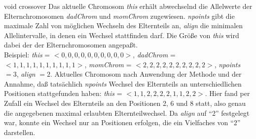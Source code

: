 \documentclass{report}
\begin{document}
    \setCorrectWidthThree{8pt}
    \printMethodWithParamsSaved
        {void}
        {}
        {crossover}
        {Das aktuelle Chromosom {\em this} erh\"alt abwechselnd die 
    Allelwerte der Elternchromosomen {\em dadChrom} und {\em momChrom} zugewiesen. {\em npoints}
    gibt die maximale Zahl von m\"oglichen Wechseln des Elternteils an, {\em align}
    die minimalen Allelintervalle, in denen ein Wechsel stattfinden darf.
    Die Gr\"o{\ss}e von {\em this} wird dabei der der Elternchromosomen angepa{\ss}t.\\
Beispiel: {\em this} = $< 0, 0, 0, 0, 0, 0, 0, 0, 0, 0 >$,
{\em dadChrom} = $< 1, 1, 1, 1, 1, 1, 1, 1, 1, 1 >$, {\em momChrom} 
= $< 2, 2, 2, 2, 2, 2, 2, 2, 2, 2 >$, {\em npoints} $= 3$, {\em align}
$= 2$. Aktuelles Chromosom nach Anwendung der Methode und der Annahme,
da{\ss} tats\"achlich {\em npoints} Wechsel des Elternteils an
unterschiedlichen Positionen stattgefunden haben:
{\em this} = $< 1, 1, 2, 2, 2, 2, 1, 1, 2, 2 >$. Hier fand per Zufall
ein Wechsel des Elternteils an den Positionen 2, 6 und 8 statt, also
genau die angegebenen maximal erlaubten Elternteilwechsel. Da {\em align}
auf ``2'' festgelegt war, konnte ein Wechsel nur an Positionen 
erfolgen, die ein Vielfaches von ``2'' darstellen.}
        {}
    \setCorrectWidthThree{4pt}

\newpage
\end{document}
